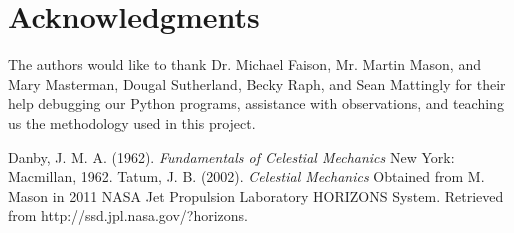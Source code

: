\documentclass[12pt,journal,compsoc]{IEEEtran}
\begin{document}
\section*{Acknowledgments}

The authors would like to thank Dr. Michael Faison, Mr. Martin Mason, and Mary Masterman, Dougal Sutherland, Becky Raph, and Sean Mattingly for their help debugging our Python programs, assistance with observations, and teaching us the methodology used in this project.


\begin{thebibliography}{1}
Danby, J. M. A. (1962). \emph{Fundamentals of Celestial Mechanics} New York: Macmillan, 1962. 
Tatum, J. B. (2002). \emph{Celestial Mechanics} Obtained from M. Mason in 2011
{}
NASA Jet Propulsion Laboratory HORIZONS System. Retrieved from http://ssd.jpl.nasa.gov/?horizons.
\end{thebibliography}
\end{document}
